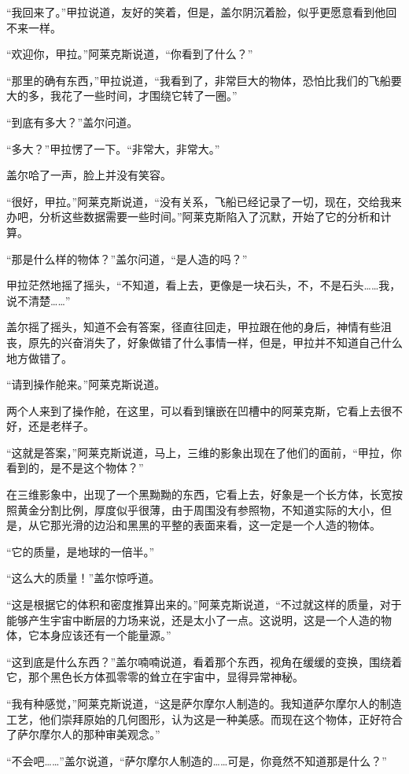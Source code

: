 “我回来了。”甲拉说道，友好的笑着，但是，盖尔阴沉着脸，似乎更愿意看到他回不来一样。 

“欢迎你，甲拉。”阿莱克斯说道，“你看到了什么？” 

“那里的确有东西，”甲拉说道，“我看到了，非常巨大的物体，恐怕比我们的飞船要大的多，我花了一些时间，才围绕它转了一圈。” 

“到底有多大？”盖尔问道。 

“多大？”甲拉愣了一下。“非常大，非常大。” 

盖尔哈了一声，脸上并没有笑容。 

“很好，甲拉。”阿莱克斯说道，“没有关系，飞船已经记录了一切，现在，交给我来办吧，分析这些数据需要一些时间。”阿莱克斯陷入了沉默，开始了它的分析和计算。 

“那是什么样的物体？”盖尔问道，“是人造的吗？” 

甲拉茫然地摇了摇头，“不知道，看上去，更像是一块石头，不，不是石头……我，说不清楚……” 

盖尔摇了摇头，知道不会有答案，径直往回走，甲拉跟在他的身后，神情有些沮丧，原先的兴奋消失了，好象做错了什么事情一样，但是，甲拉并不知道自己什么地方做错了。 

“请到操作舱来。”阿莱克斯说道。 

两个人来到了操作舱，在这里，可以看到镶嵌在凹槽中的阿莱克斯，它看上去很不好，还是老样子。 

“这就是答案，”阿莱克斯说道，马上，三维的影象出现在了他们的面前，“甲拉，你看到的，是不是这个物体？” 

在三维影象中，出现了一个黑黝黝的东西，它看上去，好象是一个长方体，长宽按照黄金分割比例，厚度似乎很薄，由于周围没有参照物，不知道实际的大小，但是，从它那光滑的边沿和黑黑的平整的表面来看，这一定是一个人造的物体。 

“它的质量，是地球的一倍半。” 

“这么大的质量！”盖尔惊呼道。 

“这是根据它的体积和密度推算出来的。”阿莱克斯说道，“不过就这样的质量，对于能够产生宇宙中断层的力场来说，还是太小了一点。这说明，这是一个人造的物体，它本身应该还有一个能量源。” 

“这到底是什么东西？”盖尔喃喃说道，看着那个东西，视角在缓缓的变换，围绕着它，那个黑色长方体孤零零的耸立在宇宙中，显得异常神秘。 

“我有种感觉，”阿莱克斯说道，“这是萨尔摩尔人制造的。我知道萨尔摩尔人的制造工艺，他们崇拜原始的几何图形，认为这是一种美感。而现在这个物体，正好符合了萨尔摩尔人的那种审美观念。” 

“不会吧……”盖尔说道，“萨尔摩尔人制造的……可是，你竟然不知道那是什么？” 

